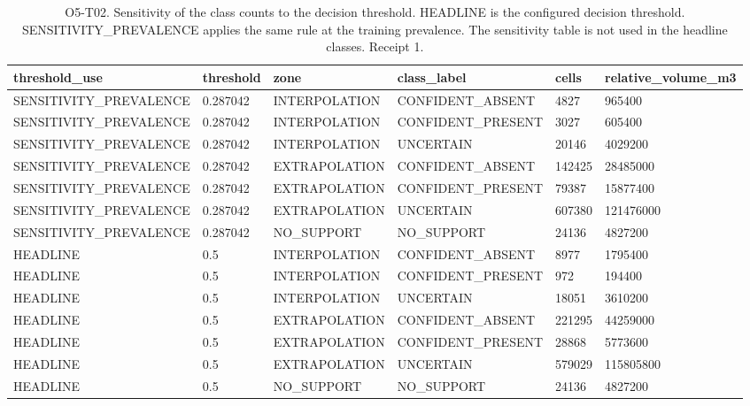 \begin{table}[ht]
\centering
\scriptsize
\caption{O5-T02. Sensitivity of the class counts to the decision threshold. HEADLINE is the configured decision threshold. SENSITIVITY\_PREVALENCE applies the same rule at the training prevalence. The sensitivity table is not used in the headline classes. Receipt 1.}
\label{tab:O5T02}
\begin{tabular}{llllll}
\toprule
threshold\_use & threshold & zone & class\_label & cells & relative\_volume\_m3 \\
\midrule
SENSITIVITY\_PREVALENCE & 0.287042 & INTERPOLATION & CONFIDENT\_ABSENT & 4827 & 965400 \\
SENSITIVITY\_PREVALENCE & 0.287042 & INTERPOLATION & CONFIDENT\_PRESENT & 3027 & 605400 \\
SENSITIVITY\_PREVALENCE & 0.287042 & INTERPOLATION & UNCERTAIN & 20146 & 4029200 \\
SENSITIVITY\_PREVALENCE & 0.287042 & EXTRAPOLATION & CONFIDENT\_ABSENT & 142425 & 28485000 \\
SENSITIVITY\_PREVALENCE & 0.287042 & EXTRAPOLATION & CONFIDENT\_PRESENT & 79387 & 15877400 \\
SENSITIVITY\_PREVALENCE & 0.287042 & EXTRAPOLATION & UNCERTAIN & 607380 & 121476000 \\
SENSITIVITY\_PREVALENCE & 0.287042 & NO\_SUPPORT & NO\_SUPPORT & 24136 & 4827200 \\
HEADLINE & 0.5 & INTERPOLATION & CONFIDENT\_ABSENT & 8977 & 1795400 \\
HEADLINE & 0.5 & INTERPOLATION & CONFIDENT\_PRESENT & 972 & 194400 \\
HEADLINE & 0.5 & INTERPOLATION & UNCERTAIN & 18051 & 3610200 \\
HEADLINE & 0.5 & EXTRAPOLATION & CONFIDENT\_ABSENT & 221295 & 44259000 \\
HEADLINE & 0.5 & EXTRAPOLATION & CONFIDENT\_PRESENT & 28868 & 5773600 \\
HEADLINE & 0.5 & EXTRAPOLATION & UNCERTAIN & 579029 & 115805800 \\
HEADLINE & 0.5 & NO\_SUPPORT & NO\_SUPPORT & 24136 & 4827200 \\
\bottomrule
\end{tabular}
\end{table}
